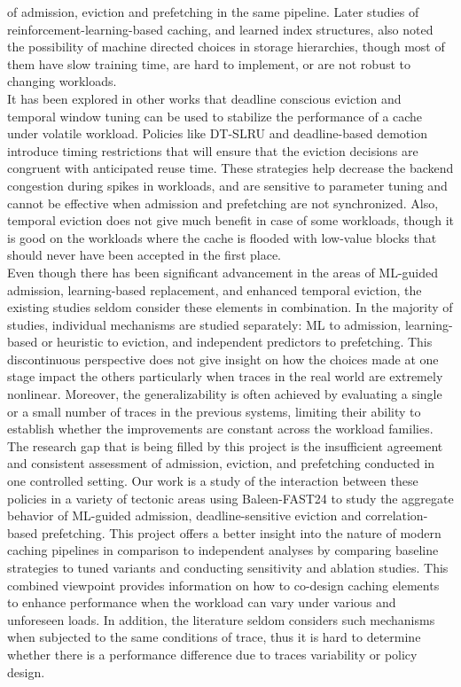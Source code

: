 \documentclass[sigconf]{acmart}
\begin{document}
{of admission, eviction and prefetching in the same pipeline. Later studies of reinforcement-learning-based caching, and learned index structures, also noted the possibility of machine directed choices in storage hierarchies, though most of them have slow training time, are hard to implement, or are not robust to changing workloads.\\\indent It has been explored in other works that deadline conscious eviction and temporal window tuning can be used to stabilize the performance of a cache under volatile workload. Policies like DT-SLRU and deadline-based demotion introduce timing restrictions that will ensure that the eviction decisions are congruent with anticipated reuse time. These strategies help decrease the backend congestion during spikes in workloads, and are sensitive to parameter tuning and cannot be effective when admission and prefetching are not synchronized. Also, temporal eviction does not give much benefit in case of some workloads, though it is good on the workloads where the cache is flooded with low-value blocks that should never have been accepted in the first place.\\\indent Even though there has been significant advancement in the areas of ML-guided admission, learning-based replacement, and enhanced temporal eviction, the existing studies seldom consider these elements in combination. In the majority of studies, individual mechanisms are studied separately: ML to admission, learning-based or heuristic to eviction, and independent predictors to prefetching. This discontinuous perspective does not give insight on how the choices made at one stage impact the others particularly when traces in the real world are extremely nonlinear. Moreover, the generalizability is often achieved by evaluating a single or a small number of traces in the previous systems, limiting their ability to establish whether the improvements are constant across the workload families.\\\indent The research gap that is being filled by this project is the insufficient agreement and consistent assessment of admission, eviction, and prefetching conducted in one controlled setting. Our work is a study of the interaction between these policies in a variety of tectonic areas using Baleen-FAST24 to study the aggregate behavior of ML-guided admission, deadline-sensitive eviction and correlation-based prefetching. This project offers a better insight into the nature of modern caching pipelines in comparison to independent analyses by comparing baseline strategies to tuned variants and conducting sensitivity and ablation studies. This combined viewpoint provides information on how to co-design caching elements to enhance performance when the workload can vary under various and unforeseen loads. In addition, the literature seldom considers such mechanisms when subjected to the same conditions of trace, thus it is hard to determine whether there is a performance difference due to traces variability or policy design.

}
\end{document}
